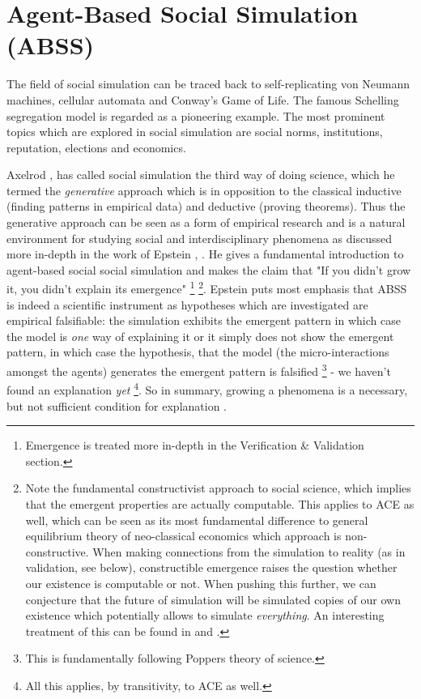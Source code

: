 \section{Agent-Based Social Simulation (ABSS)}
The field of social simulation can be traced back to self-replicating von Neumann machines, cellular automata and Conway's Game of Life. The famous Schelling segregation model \cite{schelling_dynamic_1971} is regarded as a pioneering example. The most prominent topics which are explored in social simulation are social norms, institutions, reputation, elections and economics.

Axelrod \cite{axelrod_advancing_1997}, \cite{axelrod_guide_2006} has called social simulation the third way of doing science, which he termed the \textit{generative} approach which is in opposition to the classical inductive (finding patterns in empirical data) and deductive (proving theorems). Thus the generative approach can be seen as a form of empirical research and is a natural environment for studying social and interdisciplinary phenomena as discussed more in-depth in the work of Epstein \cite{epstein_chapter_2006}, \cite{epstein_generative_2012}. He gives a fundamental introduction to agent-based social social simulation and makes the claim that "If you didn't grow it, you didn't explain its emergence" \footnote{Emergence is treated more in-depth in the Verification \& Validation section.} \footnote{Note the fundamental constructivist approach to social science, which implies that the emergent properties are actually computable. This applies to ACE as well, which can be seen as its most fundamental difference to general equilibrium theory of neo-classical economics which approach is non-constructive. When making connections from the simulation to reality (as in validation, see below), constructible emergence raises the question whether our existence is computable or not. When pushing this further, we can conjecture that the future of simulation will be simulated copies of our own existence which potentially allows to simulate \textit{everything}. An interesting treatment of this can be found in \cite{bostrom_are_2003} and \cite{steinhart_theological_2010}.}. Epstein puts most emphasis that ABSS is indeed a scientific instrument as hypotheses which are investigated are empirical falsifiable: the simulation exhibits the emergent pattern in which case the model is \textit{one} way of explaining it or it simply does not show the emergent pattern, in which case the hypothesis, that the model (the micro-interactions amongst the agents) generates the emergent pattern is falsified \footnote{This is fundamentally following Poppers theory of science.} - we haven't found an explanation \textit{yet} \footnote{All this applies, by transitivity, to ACE as well.}. So in summary, growing a phenomena is a necessary, but not sufficient condition for explanation \cite{epstein_chapter_2006}.

